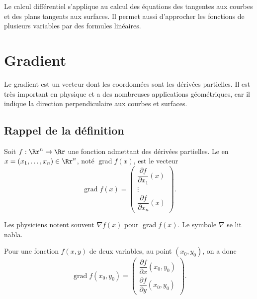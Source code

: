 \documentclass[11pt, class=report,crop=false]{standalone}
\begin{document}

\newcommand{\grad}{\operatorname{grad}} %


Le calcul différentiel s'applique au calcul des équations des tangentes aux courbes et des plans tangents aux surfaces.
Il permet aussi d'approcher les fonctions de plusieurs variables par des formules linéaires.


\section{Gradient}

Le gradient est un vecteur dont les coordonnées sont les dérivées partielles. 
Il est très important en physique et a des nombreuses applications géométriques, car il indique la direction perpendiculaire aux courbes et surfaces.

\subsection{Rappel de la définition}

\begin{definition}
Soit $f : \Rr^n \to \Rr$ une fonction admettant des dérivées partielles.
Le  en $x = (x_1,\ldots,x_n) \in \Rr^n$, noté 
$\grad f (x)$, est le vecteur 
$$\grad f (x) =
\begin{pmatrix} \dfrac{\partial f}{\partial x_{1}} (x)\\ \vdots \\ \dfrac{\partial f}{\partial x_n}(x)\end{pmatrix}.$$
\end{definition}

Les physiciens notent souvent $\nabla f (x)$ pour $\grad f (x)$.
Le symbole $\nabla$ se lit \og{}nabla\fg{}.

\bigskip

Pour une fonction $f(x,y)$ de deux variables, au point $(x_0,y_0)$, on a donc
$$\grad f(x_0,y_0) = \begin{pmatrix}  \dfrac{\partial f}{\partial x} (x_0,y_0) \\ \dfrac{\partial f}{\partial y}(x_0,y_0)\end{pmatrix}.$$
\end{document}
